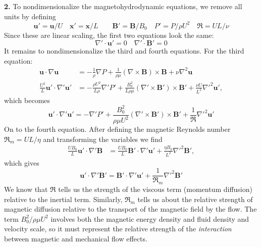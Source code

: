 \documentclass[11pt]{article}
\newcommand{\f}[2]{\frac{#1}{#2}}
\begin{document}
\noindent \textbf{2.} 
To nondimensionalize the magnetohydrodynamic equations, we remove all units by defining 
\begin{equation*}
\mathbf{u}' = \mathbf{u}/U \quad \mathbf{x'} = \mathbf{x}/L \quad \quad \mathbf{B}' = \mathbf{B}/B_0 \quad P' = P/\rho U^2 \quad \Re = UL/\nu
\end{equation*}
Since these are linear scaling, the first two equations look the same:
\begin{equation*}
\boxed{\nabla' \cdot \mathbf{u}' = 0} \quad \boxed{\nabla' \cdot \mathbf{B}' = 0}
\end{equation*}
It remains to nondimensionalize the third and fourth equations. For the third equation:
\begin{align*}
\mathbf{u} \cdot \nabla \mathbf{u} &= -\f{1}{\rho}\nabla P + \f{1}{\rho \mu}(\nabla \times \mathbf{B})\times \mathbf{B} + \nu \nabla^2 \mathbf{u} \\
\f{U^2}{L}  \mathbf{u}' \cdot \nabla' \mathbf{u}'
&= -\f{\rho U^2}{L\rho}\nabla' P' + \f{B_0^2}{ L \rho \mu} (\nabla' \times \mathbf{B}')\times \mathbf{B}' + \f{\nu U }{L^2} \nabla'^2 \mathbf{u}',
\end{align*}
which becomes
\begin{equation*}
\boxed{
\mathbf{u}' \cdot \nabla' \mathbf{u}'
= -\nabla' P' + \f{B_0^2 }{  \rho \mu U^2} (\nabla' \times \mathbf{B}')\times \mathbf{B}' + \f{1}{\Re} \nabla'^2 \mathbf{u}'
}
\end{equation*}
On to the fourth equation. After defining the magnetic Reynolds number $\Re_m = UL/\eta$ and transforming the variables we find
\begin{align*}
\f{UB_0}{L}\mathbf{u}' \cdot \nabla' \mathbf{B} 
&= \f{UB_0}{L}\mathbf{B}' \cdot \nabla' \mathbf{u}' + \f{\eta B_0}{L^2}  \nabla'^2\mathbf{B}',
\end{align*}
which gives
\begin{equation*}
\boxed{
\mathbf{u}' \cdot \nabla' \mathbf{B}'
= \mathbf{B}' \cdot \nabla' \mathbf{u}' + \f{1}{\Re_m} \nabla'^2\mathbf{B}'
}
\end{equation*}
We know that $\Re$ tells us the strength of the viscous term (momentum diffusion) relative to the inertial term. Similarly, $\Re_m$ tells us about the relative strength of magnetic diffusion relative to the transport of the magnetic field by the flow. The term $B_0^2/\rho\mu U^2$ involves both the magnetic energy density and fluid density and velocity scale, so it must represent the relative strength of the \textit{interaction} between magnetic and mechanical flow effects. 





  
\end{document}
